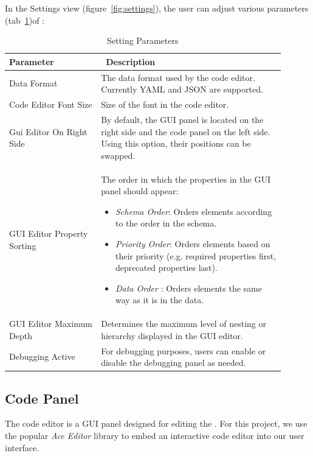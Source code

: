 In the Settings view (figure~\ref{fig:settings}), the user can adjust various parameters (tab~\ref{tab:settings})of \toolname{}:
\begin{table}
    \centering
    \caption{Setting Parameters\label{tab:settings}}
    \begin{tabular}{@{}p{0.3\linewidth}p{0.6\linewidth}@{}}
        \toprule
        \textbf{Parameter} & \textbf{\ Description} \\
        \midrule
        Data Format & The data format used by the code editor. Currently YAML and JSON are supported. \\
        Code Editor Font Size & Size of the font in the code editor. \\
        Gui Editor On Right Side & By default, the GUI panel is located on the right side and the code panel on the left side. Using this option, their positions can be swapped. \\
        GUI Editor Property Sorting & The order in which the properties in the GUI panel should appear:
        \begin{itemize}
            \item \textit{Schema Order}: Orders elements according to the order in the schema.
            \item \textit{Priority Order}: Orders elements based on their priority (e.g. required properties first, deprecated properties last).
            \item \textit{Data Order }: Orders elements the same way as it is in the data.
        \end{itemize} \\
        GUI Editor Maximum Depth & Determines the maximum level of nesting or hierarchy displayed in the GUI editor. \\
        Debugging Active & For debugging purposes, users can enable or disable the debugging panel as needed.  \\
        \bottomrule
    \end{tabular}
\end{table}


\subsection{Code Panel}\label{subsec:code-editor}

The code editor is a GUI panel designed for editing the \cfgfiles.
For this project, we use the popular \textit{Ace Editor}\cite{Ace-Editor} library to embed an interactive code editor into our user interface.

